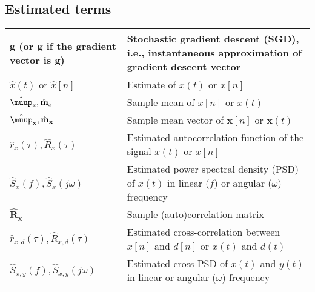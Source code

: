 \documentclass{article}
\begin{document}
\subsection{Estimated terms}
\begin{xltabular}{\textwidth}{XX}
	\(\mathbf{g}\) (or \(\hat{\mathbf{g}}\) if the gradient vector is \(\mathbf{g}\))                             & Stochastic gradient descent (SGD), i.e., instantaneous approximation of gradient descent vector            \\ \hline
	\(\hat{x}(t)\) or \(\hat{x}[n]\)                                                                              & Estimate of \(x(t)\) or \(x[n]\)                                                                           \\ \hline
	\(\hat{\boldsymbol{\muup}}_x, \hat{\mathbf{m}}_x\)                                                            & Sample mean of \(x[n]\) or \(x(t)\)                                                                        \\ \hline
	\(\hat{\boldsymbol{\muup}}_\mathbf{x}, \hat{\mathbf{m}}_\mathbf{x}\)                                          & Sample mean vector of \(\mathbf{x}[n]\) or \(\mathbf{x}(t)\)                                               \\ \hline
	\(\hat{r}_x(\tau), \hat{R}_x(\tau)\)                                                                          & Estimated autocorrelation function of the signal \(x(t)\) or \(x[n]\) \cite{nossekAdaptiveArraySignal2015} \\ \hline
	\(\hat{S}_x(f), \hat{S}_x(j\omega)\)                                                                          & Estimated power spectral density (PSD) of \(x(t)\) in linear (\(f\)) or angular (\(\omega\)) frequency     \\ \hline
	\(\hat{\mathbf{R}}_\mathbf{x}\)                                                                               & Sample (auto)correlation matrix                                                                            \\ \hline
	\(\hat{r}_{x,d}(\tau), \hat{R}_{x,d}(\tau)\)                                                                  & Estimated cross-correlation between \(x[n]\) and \(d[n]\) or \(x(t)\) and \(d(t)\)                         \\ \hline
	\(\hat{S}_{x,y}(f), \hat{S}_{x,y}(j\omega)\)                                                                  & Estimated cross PSD of \(x(t)\) and \(y(t)\) in linear or angular (\(\omega\)) frequency                   \\ \hline

\end{xltabular}
\end{document}
